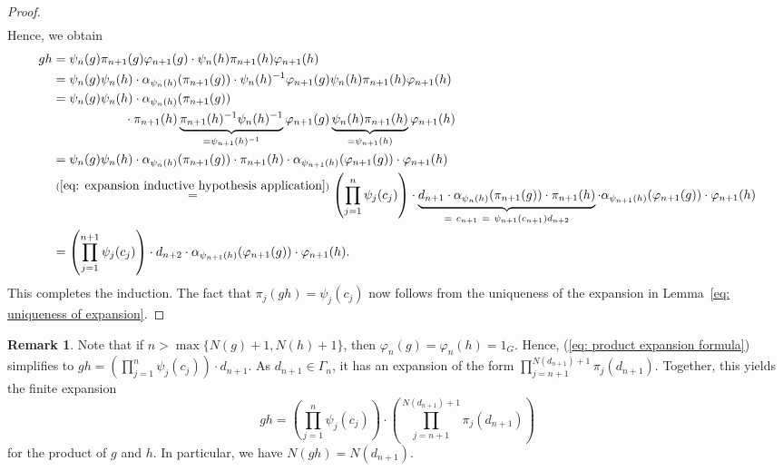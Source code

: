 \documentclass[titlepage,reqno,10pt]{amsart}
\theoremstyle{definition}
\newtheorem{remark}[theorem]{Remark}
\begin{document}
\begin{proof}
\begin{align}
\end{align}
Hence, we obtain 
\begin{align*}
    gh &= \psi_n(g)\pi_{n+1}(g) \varphi_{n+1}(g) \cdot  \psi_n(h)\pi_{n+1}(h)\varphi_{n+1}(h)\\
       &= \psi_n(g)\psi_n(h)\cdot \alpha_{\psi_n(h)}(\pi_{n+1}(g))\cdot \psi_n(h)^{-1}\varphi_{n+1}(g)\psi_n(h)\pi_{n+1}(h)\varphi_{n+1}(h) \\
       &=\psi_n(g)\psi_n(h)\cdot \alpha_{\psi_n(h)}(\pi_{n+1}(g))\\
        &\hspace{2cm}\cdot \pi_{n+1}(h)\underbrace{\pi_{n+1}(h)^{-1}\psi_n(h)^{-1}}_{=\psi_{n+1}(h)^{-1}}\varphi_{n+1}(g)\underbrace{\psi_n(h)\pi_{n+1}(h)}_{=\psi_{n+1}(h)}\varphi_{n+1}(h) \\
       &= \psi_n(g)\psi_n(h)\cdot \alpha_{\psi_n(h)}(\pi_{n+1}(g))\cdot \pi_{n+1}(h)\cdot\alpha_{\psi_{n+1}(h)}(\varphi_{n+1}(g))\cdot \varphi_{n+1}(h)   \\
    &\stackrel{(\ref{eq: expansion inductive hypothesis application})}{=} \left(\prod_{j=1}^n \psi_j(c_j)\right)\cdot \underbrace{d_{n+1} \cdot \alpha_{\psi_n(h)}(\pi_{n+1}(g)) \cdot \pi_{n+1}(h) }_{=\ c_{n+1}\ = \ \psi_{n+1}(c_{n+1})d_{n+2}}\cdot  \alpha_{\psi_{n+1}(h)}(\varphi_{n+1}(g))\cdot \varphi_{n+1}(h)   \\
    &= \left(\prod_{j=1}^{n+1}\psi_j(c_j)\right)   \cdot d_{n+2} \cdot \alpha_{\psi_{n+1}(h)}(\varphi_{n+1}(g))\cdot \varphi_{n+1}(h).
\end{align*}
This completes the induction. The fact that $\pi_j(gh) = \psi_j(c_j)$ now follows from the uniqueness of the expansion in Lemma~\ref{eq: uniqueness of expansion}. 
\end{proof}

\begin{remark}
    Note that if $n>\max\{N(g)+1,N(h)+1\}$, then $\varphi_n(g)=\varphi_n(h)=1_G$. Hence, (\ref{eq: product expansion formula}) simplifies to $gh = \left(\prod_{j=1}^n \psi_j(c_j)\right)\cdot d_{n+1}$. As $d_{n+1}\in\Gamma_{n}$, it has an expansion of the form $\prod_{j=n+1}^{N(d_{n+1})+1} \pi_j(d_{n+1})$. Together, this yields the finite expansion
    $$
    gh = \left(\prod_{j=1}^n \psi_j(c_j)\right)\cdot \left(\prod_{j=n+1}^{N(d_{n+1})+1} \pi_j(d_{n+1})\right)
    $$
    for the product of $g$ and $h$. In particular, we have $N(gh)=N(d_{n+1})$. 
\end{remark}
\end{document}
